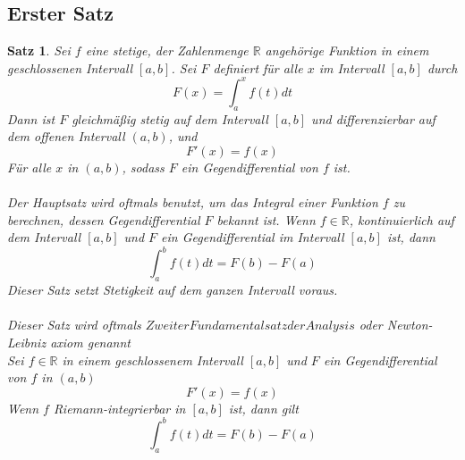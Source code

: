 \documentclass[fontsize=12pt,paper=a4,DIV12,cleardoublepage=empty, 
liststotoc,idxtotoc,bibtotoc]{article}
\newcommand{\RR}{\mathbb{R}}
\theoremstyle{plain}
\newtheorem{satz}{Satz}[subsection]
\theoremstyle{definition}
\begin{document}
	\subsection{Erster Satz}
	\begin{satz}
		Sei $f$ eine stetige, der Zahlenmenge $\RR$ angehörige Funktion in einem geschlossenen Intervall $[a, b]$. Sei $F$ definiert für alle $x$ im Intervall $[a, b]$ durch \\
			\begin{equation}
				F(x)=\int_{a}^{x}f(t) dt
			\end{equation}
		Dann ist $F$ gleichmäßig stetig auf dem Intervall $[a, b]$ und differenzierbar auf dem offenen Intervall $(a, b)$, und 
			\begin{equation}
				F'(x)=f(x)
			\end{equation}
		Für alle $x$ in $(a, b)$, sodass $F$ ein Gegendifferential von $f$ ist.\\\\

		Der Hauptsatz wird oftmals benutzt, um das Integral einer Funktion $f$ zu berechnen, dessen Gegendifferential $F$ bekannt ist. Wenn $f \in \RR$, kontinuierlich auf dem Intervall $[a, b]$ und $F$ ein Gegendifferential im Intervall $[a, b]$ ist, dann
		\begin{equation}
			\int_{a}^{b}f(t) dt=F(b)-F(a)
		\end{equation}
		Dieser Satz setzt Stetigkeit auf dem ganzen Intervall voraus.\\\\
	
	Dieser Satz wird oftmals $Zweiter Fundamentalsatz der Analysis$ oder Newton-Leibniz axiom genannt\\
	Sei $f \in \RR$ in einem geschlossenem Intervall $[a, b]$ und $F$ ein Gegendifferential von $f$ in $(a, b)$
	\begin{equation}
		F'(x)=f(x)
	\end{equation}
	Wenn $f$ Riemann-integrierbar in $[a, b]$ ist, dann gilt
	\begin{equation}
		\int_{a}^{b}f(t) dt = F(b)-F(a)
	\end{equation}
	
	\end{satz}
	
\end{document}
